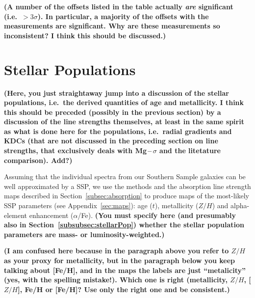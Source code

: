 \documentclass[a4paper,fleqn,usenatbib]{mnras}
\begin{document}
{\bf (A number of the offsets listed in the table actually {\em are}
  significant (i.e.\ $>3\sigma$). In particular, a majority of the
  offsets with the \citealt{Ogando2008} measurements are
  significant. Why are these measurements so inconsistent? I think
  this should be discussed.)}

\section{Stellar Populations}
\label{sec:stellarPop}

{\bf (Here, you just straightaway jump into a discussion of the
  stellar populations, i.e.\ the derived quantities of age and
  metallicity. I think this should be preceded (possibly in the
  previous section) by a discussion of the line strengths themselves,
  at least in the same spirit as what is done here for the
  populations, i.e.\ radial gradients and KDCs (that are not discussed
  in the preceding section on line strengths, that exclusively deals
  with Mg\,--\,$\sigma$ and the litetature comparison). Add?)}

Assuming that the individual spectra from our Southern Sample galaxies
can be well approximated by a SSP, we use the methods and the
absorption line strength maps described in
Section~\ref{subsec:absorption} to produce maps of the most-likely SSP
parameters (see Appendix~\ref{sec:maps}): age ($t$), metallicity
($Z/H$) and alpha-element enhancement ($\alpha$/Fe). {\bf (You must
  specify here (and presumably also in
  Section~\ref{subsubsec:stellarPop}) whether the stellar population
  parameters are mass- or luminosity-weighted.)}

{\bf (I am confused here because in the paragraph above you refer to
  $Z/H$ as your proxy for metallicity, but in the paragraph below you
  keep talking about [Fe/H], and in the maps the labels are just
  ``metalicity'' (yes, with the spelling mistake!). Which one is right
  (metallicity, $Z/H$, [$Z/H$], Fe/H or [Fe/H]? Use only the right one
  and be consistent.)}
\end{document}
